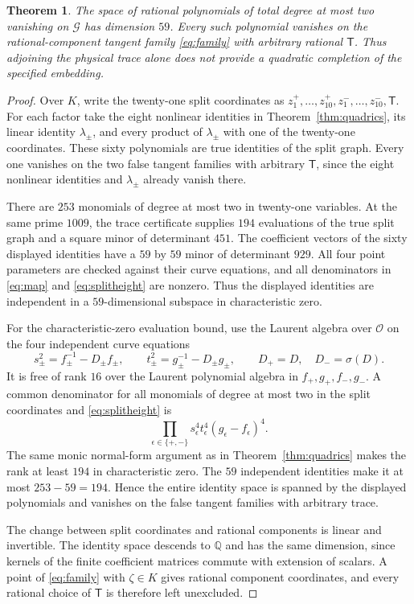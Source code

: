 \documentclass[11pt,a4paper]{article}
\newtheorem{theorem}{Theorem}[section]
\newcommand{\Q}{\mathbb Q}\newcommand{\Z}{\mathbb Z}
\begin{document}
\begin{theorem}\label{thm:trace}
The space of rational polynomials of total degree at most two
vanishing on $\mathcal G$ has dimension $59$. Every such polynomial
vanishes on the rational-component tangent family
\eqref{eq:family} with \emph{arbitrary} rational $\mathsf T$.
Thus adjoining the physical trace alone does not provide a quadratic
completion of the specified embedding.
\end{theorem}
\begin{proof}
Over $K$, write the twenty-one split coordinates as
$z_1^+,\ldots,z_{10}^+,z_1^-,\ldots,z_{10}^-,\mathsf T$.
For each factor take the eight nonlinear identities in
Theorem~\ref{thm:quadrics}, its linear identity $\lambda_\pm$,
and every product of $\lambda_\pm$ with one of the twenty-one
coordinates. These sixty polynomials are true identities of the
split graph. Every one vanishes on the two false tangent families
with arbitrary $\mathsf T$, since the eight nonlinear identities
and $\lambda_\pm$ already vanish there.

There are $253$ monomials of degree at most two in twenty-one
variables. At the same prime $1009$, the trace certificate supplies
$194$ evaluations of the true split graph and a square minor of
determinant $451$. The coefficient vectors of the sixty displayed
identities have a $59$ by $59$ minor of determinant $929$.
All four point parameters are checked against their curve equations,
and all denominators in \eqref{eq:map} and \eqref{eq:splitheight}
are nonzero. Thus the displayed identities are independent in a
$59$-dimensional subspace in characteristic zero.

For the characteristic-zero evaluation bound, use the Laurent
algebra over $\mathcal O$ on the four independent curve equations
\[
 s_\pm^2=f_\pm^{-1}-D_\pm f_\pm,\qquad
 t_\pm^2=g_\pm^{-1}-D_\pm g_\pm,
 \qquad D_+=D,\quad D_-=\sigma(D).
\]
It is free of rank $16$ over the Laurent polynomial algebra in
$f_+,g_+,f_-,g_-$. A common denominator for all monomials of
degree at most two in the split coordinates and \eqref{eq:splitheight}
is
\[
 \prod_{\epsilon\in\{+,-\}}
          s_\epsilon^4t_\epsilon^4(g_\epsilon-f_\epsilon)^4.
\]
The same monic normal-form argument as in
Theorem~\ref{thm:quadrics} makes the rank at least $194$ in
characteristic zero. The $59$ independent identities make it at
most $253-59=194$. Hence the entire identity space is spanned by
the displayed polynomials and vanishes on the false tangent families
with arbitrary trace.

The change between split coordinates and rational components is
linear and invertible. The identity space descends to $\Q$ and has
the same dimension, since kernels of the finite coefficient matrices
commute with extension of scalars. A point of \eqref{eq:family} with
$\zeta\in K$ gives rational component coordinates, and every rational
choice of $\mathsf T$ is therefore left unexcluded.
\end{proof}
\end{document}
